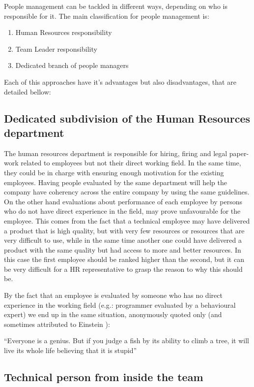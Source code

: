 People management can be tackled in different ways, depending on who is responsible for it. The main classification for people management is:
\begin{enumerate}
\item Human Resources responsibility
\item Team Leader responsibility 
\item Dedicated branch of people managers
\end{enumerate}

Each of this approaches have it's advantages but also disadvantages, that are detailed bellow:
\subsection{Dedicated subdivision of the Human Resources department}
\label{subsec:hrdep}

The human resources department is responsible for hiring, firing and legal paper-work related to employees but not their direct working field. In the same time, they could be in charge with ensuring enough motivation for the existing employees. Having people evaluated by the same department will help the company have coherency across the entire company by using the same guidelines. On the other hand evaluations about performance of each employee by persons who do not have direct experience in the field, may prove unfavourable for the employee. This comes from the fact that a technical employee may have delivered a product that is high quality, but with very few resources or resources that are very difficult to use, while in the same time another one could have delivered a product with the same quality but had access to more and better resources. In this case the first employee should be ranked higher than the second, but it can be very difficult for a HR representative to grasp the reason to why this should be. 

By the fact that an employee is evaluated by someone who has no direct experience in the working field (e.g.: programmer evaluated by a behavioural expert) we end up in the same situation, anonymously quoted only (and sometimes attributed to Einstein \cite{aeq}): 
\begin{displayquote}
``Everyone is a genius. But if you judge a fish by its ability to climb a tree, it will live its whole life believing that it is stupid''
\end{displayquote}

\subsection{Technical person from inside the team}
\label{subsec:techin}

